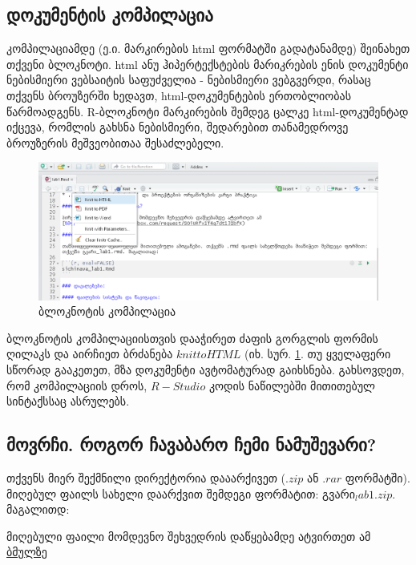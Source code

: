 \documentclass{article}
\begin{document}
\subsection*{დოკუმენტის კომპილაცია}

კომპილაციამდე (ე.ი. მარკირების html ფორმატში გადატანამდე) შეინახეთ თქვენი ბლოკნოტი. html ანუ ჰიპერტექსტების მარიკრების ენის დოკუმენტი ნებისმიერი ვებსაიტის საფუძველია - ნებისმიერი ვებგვერდი, რასაც თქვენს ბროუზერში ხედავთ, html-დოკუმენტების ერთობლიობას წარმოადგენს. R-ბლოკნოტი მარკირების შემდეგ ცალკე html-დოკუმენტად იქცევა, რომლის გახსნა ნებისმიერი, შედარებით თანამედროვე ბროუზერის მეშვეობითაა შესაძლებელი.

\begin{figure}[h]
\centering
\includegraphics[width=\textwidth]{img/knit_to_html.PNG}
\caption{ბლოკნოტის კომპილაცია}
    \label{compile}
\end{figure}


ბლოკნოტის კომპილაციისთვის დააჭირეთ ძაფის გორგლის ფორმის ღილაკს და აირჩიეთ ბრძანება $knit to HTML$ (იხ. სურ. \ref{compile}. თუ ყველაფერი სწორად გააკეთეთ, მზა დოკუმენტი ავტომატურად გაიხსნება. გახსოვდეთ, რომ კომპილაციის დროს, $R-Studio$ კოდის ნაწილებში მითითებულ სინტაქსსაც ასრულებს.

\subsection*{მოვრჩი. როგორ ჩავაბარო ჩემი ნამუშევარი?}

თქვენს მიერ შექმნილი დირექტორია დააარქივეთ ($.zip$ ან $.rar$ ფორმატში). მიღებულ ფაილს სახელი დაარქვით შემდეგი ფორმატით: გვარი$_lab1.zip$. მაგალითდ:


მიღებული ფაილი მომდევნო შეხვედრის დაწყებამდე ატვირთეთ ამ \href{https://www.dropbox.com/request/SOiURfx1T4q7dt13IbfK}{ბმულზე}
\end{document}

